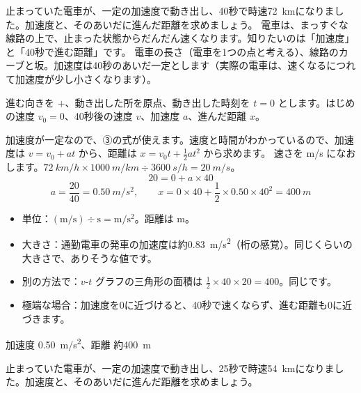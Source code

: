 \begin{lrbox}{\pxbplota}\end{lrbox}%
\begin{phreidai}[電車が動き出す]
\label{ph:力-1:ex1}止まっていた電車が、一定の加速度で動き出し、40秒で時速\qty{72}{km}になりました。加速度と、そのあいだに進んだ距離を求めましょう。
\phbamen
電車は、まっすぐな線路の上で、止まった状態からだんだん速くなります。知りたいのは「加速度」と「40秒で進む距離」です。
\phmushi
電車の長さ（電車を1つの点と考える）、線路のカーブと坂。加速度は40秒のあいだ一定とします（実際の電車は、速くなるにつれて加速度が少し小さくなります）。
\phzu
\noindent\begin{minipage}[c]{0.5\linewidth}\centering
\usebox{\pxbplota}
\end{minipage}\hfill
\begin{minipage}[c]{0.47\linewidth}
進む向きを $+$、動き出した所を原点、動き出した時刻を $t=0$ とします。はじめの速度 $v_0=0$、40秒後の速度 $v$、加速度 $a$、進んだ距離 $x$。
\end{minipage}
\phriyu
加速度が一定なので、③の式が使えます。速度と時間がわかっているので、加速度は $v=v_0+at$ から、距離は $x=v_0t+\tfrac{1}{2}at^2$ から求めます。
\phtateru
速さを m/s になおします。$\qty{72}{km/h}\times\qty{1000}{m/km}\div\qty{3600}{s/h}=\qty{20}{m/s}$。
\[ 20=0+a\times40 \]
\phtoku
\[ a=\frac{20}{40}=\qty{0.50}{m/s^2},\qquad x=0\times40+\frac{1}{2}\times0.50\times40^2=\qty{400}{m} \]
\phtashikame
\begin{itemize}[leftmargin=1.2\zw, itemsep=1pt, topsep=1pt, label={\color{bkTheme}●}]
\item 単位：$(\mathrm{m/s})\div\mathrm{s}=\mathrm{m/s^2}$。距離は m。
\item 大きさ：通勤電車の発車の加速度は約\qty{0.83}{m/s^2}（桁の感覚）。同じくらいの大きさで、ありそうな値です。
\item 別の方法で：$v$-$t$ グラフの三角形の面積は $\tfrac{1}{2}\times40\times20=400$。同じです。
\item 極端な場合：加速度を0に近づけると、40秒で速くならず、進む距離も0に近づきます。
\end{itemize}
\kotae 加速度 \qty{0.50}{m/s^2}、距離 約\qty{400}{m}
\end{phreidai}
\begin{jibun}
止まっていた電車が、一定の加速度で動き出し、25秒で時速\qty{54}{km}になりました。加速度と、そのあいだに進んだ距離を求めましょう。
\end{jibun}

